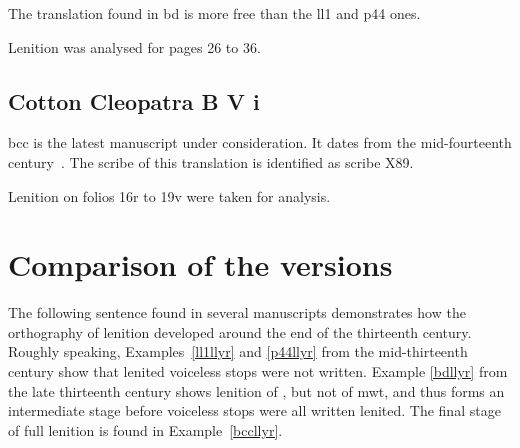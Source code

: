 The translation found in \gls{bd} is more free than the \gls{ll1} and \gls{p44} ones.


Lenition was analysed for pages 26 to 36.
\subsection{Cotton Cleopatra B V i}
\label{sec:cotton-cleopatra-b}
\Gls{bcc} is the latest manuscript under consideration.
It dates from the mid-fourteenth century~\autocite[xlv]{roberts_astudiaeth_1969}.
The scribe of this  translation is identified as scribe X89\autocite{_tei_???}. 

Lenition on folios 16r to 19v were taken for analysis.

\section{Comparison of the versions}
\label{sec:comparison-versions}
The following sentence found in several manuscripts demonstrates how the orthography of lenition developed around the end of the thirteenth century.
Roughly speaking, Examples~\ref{ll1llyr} and \ref{p44llyr} from the mid-thirteenth century show that lenited voiceless stops were not written.
Example \ref{bdllyr} from the late thirteenth century shows lenition of , but not of mw{t}, and thus forms an intermediate stage before voiceless stops were all written lenited. The final stage of full lenition is found in Example~\ref{bccllyr}.

